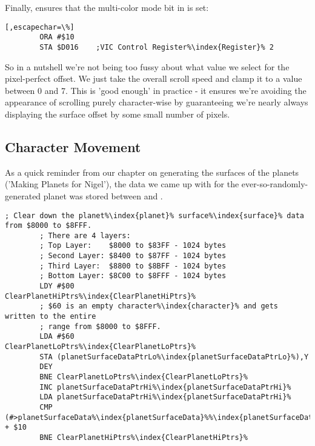 Finally,  ensures that the multi-color mode bit in  is set:

\begin{lstlisting}[,escapechar=\%]
        ORA #$10
        STA $D016    ;VIC Control Register%\index{Register}% 2
\end{lstlisting}

So in a nutshell we're not being too fussy about what value we select for the pixel-perfect offset. We
just take the overall scroll speed and clamp it to a value between 0 and 7. This is 'good enough' in 
practice - it ensures we're avoiding the appearance of scrolling purely character-wise by guaranteeing
we're nearly always displaying the surface offset by some small number of pixels.

\subsection{Character Movement}

As a quick reminder from our chapter on generating the surfaces of the planets ('Making Planets for Nigel'),
the data we came up with for the ever-so-randomly-generated planet was stored between  and .

\begin{lstlisting}[escapechar=\%,caption=The surface\index{surface} data is stored from \icode{\$8000} to \icode{\$8FFF}. This code overwrites it all with 
the value \$60\, which is an empty bitmap.]
        ; Clear down the planet%\index{planet}% surface%\index{surface}% data from $8000 to $8FFF.
        ; There are 4 layers:
        ; Top Layer:    $8000 to $83FF - 1024 bytes 
        ; Second Layer: $8400 to $87FF - 1024 bytes 
        ; Third Layer:  $8800 to $8BFF - 1024 bytes 
        ; Bottom Layer: $8C00 to $8FFF - 1024 bytes 
        LDY #$00
ClearPlanetHiPtrs%\index{ClearPlanetHiPtrs}%   
        ; $60 is an empty character%\index{character}% and gets written to the entire
        ; range from $8000 to $8FFF.
        LDA #$60
ClearPlanetLoPtrs%\index{ClearPlanetLoPtrs}%   
        STA (planetSurfaceDataPtrLo%\index{planetSurfaceDataPtrLo}%),Y
        DEY
        BNE ClearPlanetLoPtrs%\index{ClearPlanetLoPtrs}%
        INC planetSurfaceDataPtrHi%\index{planetSurfaceDataPtrHi}%
        LDA planetSurfaceDataPtrHi%\index{planetSurfaceDataPtrHi}%
        CMP (#>planetSurfaceData%\index{planetSurfaceData}%%\index{planetSurfaceData%\index{planetSurfaceData}%}%) + $10
        BNE ClearPlanetHiPtrs%\index{ClearPlanetHiPtrs}%
\end{lstlisting}

